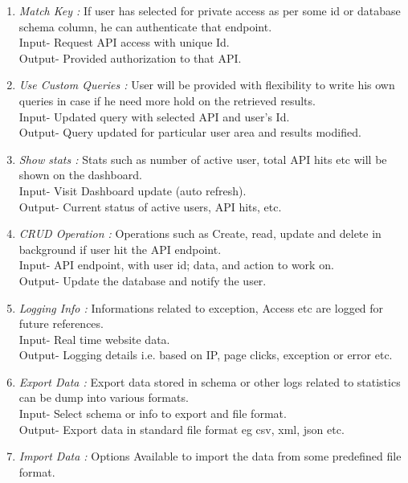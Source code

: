 \documentclass[a4paper,12pt]{report}
\begin{document}
\begin{enumerate}
{        Output- Generate unique authentication id and update/store it to database.
      }
      \item {\emph {Match Key :} If user has selected for private access as per some id or database schema column, he can authenticate that endpoint.\\
        Input- Request API access with unique Id. \\
        Output- Provided authorization to that API.
      }
      \item {\emph {Use Custom Queries : }  User will be provided with flexibility to write his own queries in case if he need more hold on the retrieved results. \\
        Input- Updated query with selected API and user’s Id. \\
        Output- Query updated for particular user area and results modified.      
      }
      \item {\emph {Show stats :} Stats such as number of active user, total API hits etc will be shown on the dashboard. \\
        Input- Visit Dashboard update (auto refresh). \\
        Output- Current status of active users, API hits, etc.
      }
      \item {\emph {CRUD Operation :}  Operations such as Create, read, update and delete in background if user hit the API endpoint. \\
        Input- API endpoint, with user id; data, and action to work on. \\
        Output- Update the database and notify the user.
      }
      \item {\emph {Logging Info :} Informations related to exception, Access etc are logged for future references. \\
        Input- Real time website data. \\
        Output- Logging details i.e. based on IP, page clicks, exception or error etc.  
      }
      \item {\emph {Export Data : } Export data stored in schema or other logs related to statistics can be dump into various formats. \\
        Input- Select schema or info to export and file format.\\
        Output- Export data in standard file format eg csv, xml, json etc.  
      }
      \item {\emph {Import Data :}  Options Available to import the data from some predefined file format. \\
}
\end{enumerate}
\end{document}
